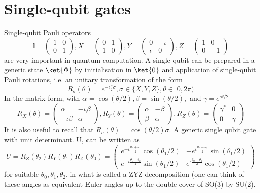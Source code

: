 \documentclass[12pt, oneside]{book}
\theoremstyle{definition}
\theoremstyle{definition}
\theoremstyle{remark}
\begin{document}
\section{Single-qubit gates}
Single-qubit Pauli operators
\[
\mathbb{I}=\begin{pmatrix} 1 & 0 \\ 0 & 1 \end{pmatrix},X=\begin{pmatrix} 0 & 1 \\ 1 & 0 \end{pmatrix}, Y=\begin{pmatrix} 0 & -\iota \\ \iota & 0 \end{pmatrix}, Z=\begin{pmatrix} 1 & 0 \\ 0 & -1 \end{pmatrix}
\]
are very important in quantum computation. A single qubit can be prepared in a generic state $\ket{\Phi}$ by initialisation in $\ket{0}$ and application of single-qubit Pauli rotations, i.e. an unitary transformation of the form
\[
R_{\sigma}(\theta)=e^{-\iota \frac{\theta}{2}\sigma},\sigma \in \{X,Y,Z\}, \theta \in [0,2\pi)
\]
In the matrix form, with $\alpha = \cos(\theta/2), \beta=\sin (\theta/2), $ and $\gamma=e^{\iota \theta/2}$
\[
R_X(\theta)=\begin{pmatrix} \alpha & -\iota \beta \\ -\iota \beta & \alpha \end{pmatrix}, R_Y(\theta)=\begin{pmatrix} \alpha & -\beta \\ \beta & \alpha \end{pmatrix}, R_Z(\theta)=\begin{pmatrix} \gamma^* & 0 \\ 0 & \gamma \end{pmatrix}
\]
It is also useful to recall that $R_{\sigma}(\theta)=\cos (\theta/2)\sigma$. A generic single qubit gate with unit determinant. U, can be written as
\[
U=R_Z(\theta_2)R_Y(\theta_1)R_Z(\theta_0)=\begin{pmatrix} e^{-\iota \frac{\theta_0+\theta_1}{2}} \cos (\theta_1/2) & -e^{\iota \frac{\theta_0-\theta_2}{2}}\sin (\theta_1/2) \\ e^{-\iota \frac{\theta_0-\theta_2}{2}} \sin (\theta_1/2) & e^{\iota \frac{\theta_0+\theta_2}{2}}\cos (\theta_1/2) \end{pmatrix}
\]
for suitable $\theta_0,\theta_1,\theta_2$, in what is called a ZYZ decomposition (one can think of these angles as equivalent Euler angles up to the double cover of SO(3) by SU(2).
\end{document}
